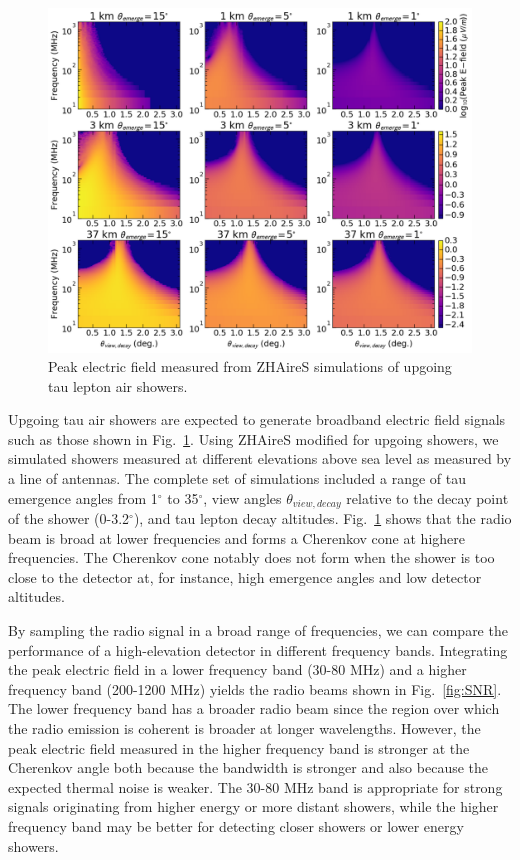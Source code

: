 \documentclass{PoS}
\begin{document}
\begin{figure}[htbp]
\begin{center}
\includegraphics[width=\textwidth]{figures/efield_sims_logscale}
\caption{Peak electric field measured from ZHAireS simulations of upgoing tau lepton air showers.}
\label{fig:efield}
\end{center}
\end{figure}

Upgoing tau air showers are expected to generate broadband electric field signals such as those shown in Fig.~\ref{fig:efield}. Using ZHAireS modified for upgoing showers, we simulated showers measured at different elevations above sea level as measured by a line of antennas. The complete set of simulations included a range of tau emergence angles from 1$^{\circ}$ to 35$^{\circ}$, view angles $\theta_{view,decay}$ relative to the decay point of the shower (0-3.2$^{\circ}$), and tau lepton decay altitudes. Fig.~\ref{fig:efield} shows that the radio beam is broad at lower frequencies and forms a Cherenkov cone at highere frequencies. The Cherenkov cone notably does not form when the shower is too close to the detector at, for instance, high emergence angles and low detector altitudes. 

By sampling the radio signal in a broad range of frequencies, we can compare the performance of a high-elevation detector in different frequency bands. Integrating the peak electric field in a lower frequency band (30-80 MHz) and a higher frequency band (200-1200 MHz) yields the radio beams shown in Fig.~\ref{fig:SNR}. %
The lower frequency band has a broader radio beam since the region over which the radio emission is coherent is broader at longer wavelengths. However, the peak electric field measured in the higher frequency band is stronger at the Cherenkov angle both because the bandwidth is stronger and also because the expected thermal noise is weaker. The 30-80 MHz band is appropriate for strong signals originating from higher energy or more distant showers, while the higher frequency band may be better for detecting closer showers or lower energy showers.
\end{document}
